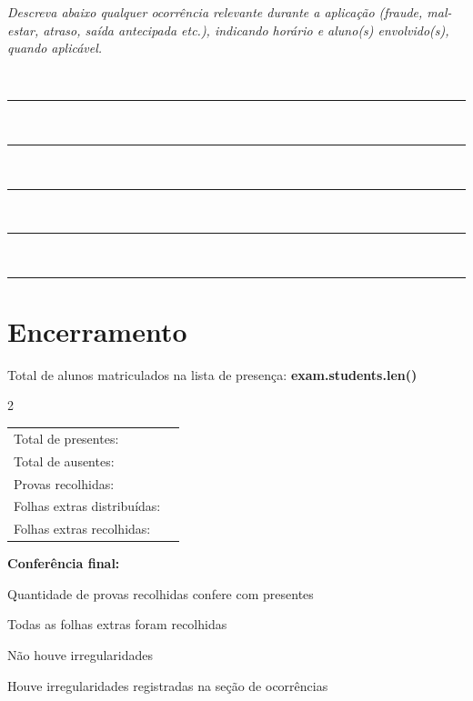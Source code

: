 \documentclass[11pt,a4paper]{article}
\newcommand{\digitbox}{
    {\color{fieldline}\fbox{\color{black}\rule{0pt}{2.2ex}\hspace{0.7em}}}
}
\newcommand{\twodigits}{
    {\color{fieldline}\fbox{\color{black}\rule{0pt}{2.2ex}\hspace{0.7em}}}\null
    {\color{fieldline}\fbox{\color{black}\rule{0pt}{2.2ex}\hspace{0.7em}}}
}
\newcommand{\threedigits}{
    {\color{fieldline}\fbox{\color{black}\rule{0pt}{2.2ex}\hspace{0.7em}}}\null
    {\color{fieldline}\fbox{\color{black}\rule{0pt}{2.2ex}\hspace{0.7em}}}\null
    {\color{fieldline}\fbox{\color{black}\rule{0pt}{2.2ex}\hspace{0.7em}}}
}
\newcommand{\notedline}[1]{
    \noindent{\color{ink}\bfseries #1.}\ {\color{fieldline}\rule[-0.1cm]{0.9\textwidth}{0.4pt}}\par
    \vspace{0.9cm}
}
\begin{document}
\small\textit{Descreva abaixo qualquer ocorrência relevante durante a aplicação (fraude,
mal-estar, atraso, saída antecipada etc.), indicando horário e aluno(s) envolvido(s),
quando aplicável.}

\bigskip

\begin{minipage}{\textwidth}
\notedline{1}
\notedline{2}
\notedline{3}
\notedline{4}
\notedline{5}
\end{minipage}


\needspace{9cm}

\section*{Encerramento}

Total de alunos matriculados na lista de presença: \textbf{ {{ exam.students.len() }} }

\begin{multicols}{2}
    \begin{tabularx}{\textwidth}{lX}
        Total de presentes:         &
        \twodigits
        \\[0.2cm]

        Total de ausentes:          &
        \twodigits
        \\[0.2cm]

        Provas recolhidas:          &
        \threedigits
        \\[0.2cm]

        Folhas extras distribuídas: &
        \twodigits
        \\[0.2cm]

        Folhas extras recolhidas:   &
        \twodigits
    \end{tabularx}

    \textbf{
        Conferência final:
    }

    \vspace{0.2cm}

    \digitbox Quantidade de provas recolhidas confere com presentes
    \vspace{0.2cm}

    \digitbox Todas as folhas extras foram recolhidas
    \vspace{0.2cm}

    \digitbox Não houve irregularidades
    \vspace{0.2cm}

    \digitbox Houve irregularidades registradas na seção de ocorrências
    \vspace{0.2cm}

    \vspace{2cm}
\end{multicols}
\end{document}
